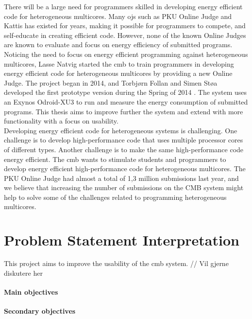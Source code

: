 There will be a large need for programmers skilled in developing energy efficient code for heterogeneous multicores. Many \gls{ojs} such as PKU Online Judge and Kattis has existed for years, making it possible for programmers to compete, and self-educate in creating efficient code. However, none of the known Online Judges are known to evaluate and focus on energy efficiency of submitted programs. Noticing the need to focus on energy efficient programming against heterogeneous multicores, Lasse Natvig started the \gls{cmb} to train programmers in developing energy efficient code for heterogeneous multicores by providing a new Online Judge. The project began in 2014, and Torbjørn Follan and Simen Støa developed the first prototype version during the Spring of 2014 \cite{mt:T&S}. The system uses an Exynos Odroid-XU3 \cite{m:XU3} to run and measure the energy consumption of submitted programs. This thesis aims to improve further the system and extend with more functionality with a focus on usability. \\

Developing energy efficient code for heterogeneous systems is challenging. One challenge is to develop high-performance code that uses multiple processor cores of different types. Another challenge is to make the same high-performance code energy efficient. The \gls{cmb} wants to stimulate students and programmers to develop energy efficient high-performance code for heterogeneous multicores. The PKU Online Judge had almost a total of 1,3 million submissions last year, and we believe that increasing the number of submissions on the CMB system might help to solve some of the challenges related to programming heterogeneous multicores. \\

\clearpage

\section{Problem Statement Interpretation}
\label{sec:rq}
This project aims to improve the usability of the \gls{cmb} system.
// Vil gjerne diskutere her


\paragraph*{Main objectives} \hfill


\paragraph*{Secondary objectives} \hfill



